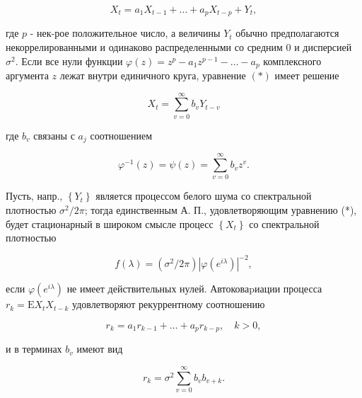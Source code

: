 \documentclass[10pt]{article}
\begin{document}
\[

X_{t}=a_{1} X_{t-1}+\ldots+a_{p} X_{t-p}+Y_{t},

\]



где $p$ - нек-рое положительное число, а величины $Y_{t}$ обычно предполагаются некоррелированными и одинаково распределенными со средним 0 и дисперсией $\sigma^{2}$. Если все нули функции $\varphi(z)=z^{p}-a_{1} z^{p-1}-\ldots-a_{p}$ комплексного аргумента $z$ лежат внутри единичного круга, уравнение $(*)$ имеет решение



\[

X_{t}=\sum_{v=0}^{\infty} b_{v} Y_{t-v}

\]



где $b_{v}$ связаны с $a_{j}$ соотношением



\[

\varphi^{-1}(z)=\psi(z)=\sum_{v=0}^{\infty} b_{v} z^{v} .

\]



Пусть, напр., $\left\{Y_{t}\right\}$ является процессом белого шума со спектральной плотностью $\sigma^{2} / 2 \pi$; тогда единственным А. П., удовлетворяющим уравнению (*), будет стационарный в широком смысле процесс $\left\{X_{t}\right\}$ со спектральной плотностью



\[

f(\lambda)=\left(\sigma^{2} / 2 \pi\right)\left|\varphi\left(e^{i \lambda}\right)\right|^{-2},

\]



если $\varphi\left(e^{i \lambda}\right)$ не имеет действительных нулей. Автоковаpиации процесса $r_{k}=\mathrm{E} X_{t} X_{t-k}$ удовлетворяют рекуррентному соотношению



\[

r_{k}=a_{1} r_{k-1}+\ldots+a_{p} r_{k-p}, \quad k>0,

\]



и в терминах $b_{v}$ имеют вид



\[

r_{k}=\sigma^{2} \sum_{v=0}^{\infty} b_{v} b_{v+k} .

\]
\end{document}
